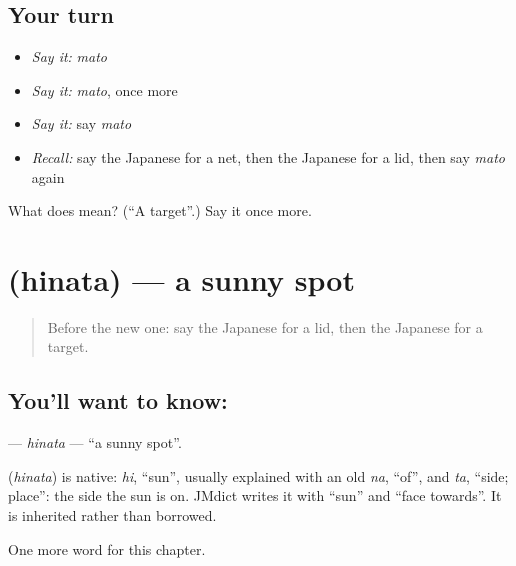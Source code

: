 \subsection*{Your turn}
\begin{itemize}
\raggedright
  \item \emph{Say it:} \emph{mato}
  \item \emph{Say it:} \emph{mato}, once more
  \item \emph{Say it:} say \emph{mato}
  \item \emph{Recall:} say the Japanese for a net, then the Japanese for a lid, then say \emph{mato} again
\end{itemize}

\begin{tcolorbox}[breakable,colback=teal!4,colframe=teal!35!black,title={Before you move on}]
What does  mean? (\textquotedblleft{}A target\textquotedblright{}.) Say it once more.
\end{tcolorbox}
\section[\texorpdfstring{\ja{ひなた} (hinata)}{ひなた (hinata)}]{ (hinata) — a sunny spot}

\label{lesson:JA-C115-hinata}



\begin{quote}
Before the new one: say the Japanese for a lid, then the Japanese for a target.
\end{quote}

\subsection*{You'll want to know: }
\textbf{} — \emph{hinata} — \textquotedblleft{}a sunny spot\textquotedblright{}.

\begin{cousinweb}
\textbf{} (\emph{hinata}) is native: \emph{hi}, \textquotedblleft{}sun\textquotedblright{}, usually explained with an old \emph{na}, \textquotedblleft{}of\textquotedblright{}, and \emph{ta}, \textquotedblleft{}side; place\textquotedblright{}: the side the sun is on. JMdict writes it with \textquotedblleft{}sun\textquotedblright{} and \textquotedblleft{}face towards\textquotedblright{}. It is inherited rather than borrowed.
\end{cousinweb}

\begin{grammarlens}[title={What you've built}]
One more word for this chapter.
\end{grammarlens}

